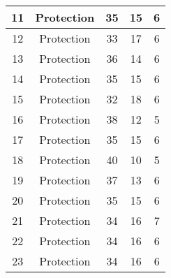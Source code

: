 \documentclass[results.tex]{subfiles}
\begin{document}
\begin{center}
\begin{tabular}{| c || c | c | c | c |}
            \hline
            11                      & Protection                   & 35                     & 15                      & 6                    \\
            \hline
            12                      & Protection                   & 33                     & 17                      & 6                    \\
            \hline
            13                      & Protection                   & 36                     & 14                      & 6                    \\
            \hline
            14                      & Protection                   & 35                     & 15                      & 6                    \\
            \hline
            15                      & Protection                   & 32                     & 18                      & 6                    \\
            \hline
            16                      & Protection                   & 38                     & 12                      & 5                    \\
            \hline
            17                      & Protection                   & 35                     & 15                      & 6                    \\
            \hline
            18                      & Protection                   & 40                     & 10                      & 5                    \\
            \hline
            19                      & Protection                   & 37                     & 13                      & 6                    \\
            \hline
            20                      & Protection                   & 35                     & 15                      & 6                    \\
            \hline
            21                      & Protection                   & 34                     & 16                      & 7                    \\
            \hline
            22                      & Protection                   & 34                     & 16                      & 6                    \\
            \hline
            23                      & Protection                   & 34                     & 16                      & 6                    \\

\end{tabular}
\end{center}
\end{document}
